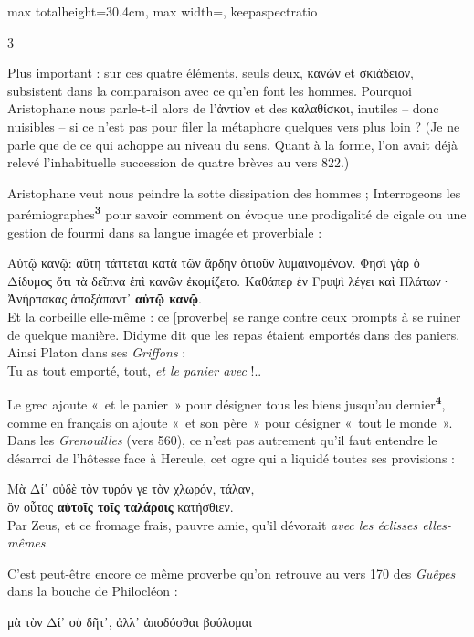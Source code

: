 \documentclass[11pt,twoside]{book}
\newcommand{\italique}[1]{\textit{#1}}
\newcommand{\citComm}[1]{\begin{quoting}[vskip=0.4pt,leftmargin=0.7em,rightmargin=0.2em]#1\end{quoting}}
\newcommand{\marqueur}[1]{\textsuperscript{\color{rubricRed}\textbf{#1}}}
\begin{document}
\begin{adjustbox}{max totalheight=30.4cm, max width=\textwidth, keepaspectratio}
\begin{minipage}{\textwidth}
{\begin{multicols}{3}
\par\vspace{1.5pt}
\noindent Plus important : sur ces quatre éléments, seuls deux, κανών et σκιάδειον, subsistent dans la comparaison avec ce qu'en font les hommes. Pourquoi Aristophane nous parle-t-il alors de l'ἀντίον et des καλαθίσκοι, inutiles -- donc nuisibles -- si ce n'est pas pour filer la métaphore quelques vers plus loin ? (Je ne parle que de ce qui achoppe au niveau du sens. Quant à la forme, l'on avait déjà relevé l'inhabituelle succession de quatre brèves au vers 822.)\\
\par\vspace{1.5pt}
\noindent Aristophane veut nous peindre la sotte dissipation des hommes ; Interrogeons les parémiographes\marqueur{3} pour savoir comment on évoque une prodigalité de cigale ou une gestion de fourmi dans sa langue imagée et proverbiale :
\citComm{Αὐτῷ κανῷ: αὕτη τάττεται κατὰ τῶν ἄρδην ὁτιοῦν λυμαινομένων. Φησὶ γὰρ ὁ Δίδυμος ὅτι τὰ δεῖπνα ἐπὶ κανῶν ἐκομίζετο. Καθάπερ ἐν Γρυψὶ λέγει καὶ Πλάτων·\\
Ἀνήρπακας ἁπαξάπαντ᾿ \textbf{αὐτῷ κανῷ}.\\
Et la corbeille elle-même : ce [proverbe] se range contre ceux prompts à se ruiner de quelque manière. Didyme dit que les repas étaient emportés dans des paniers. Ainsi Platon dans ses \italique{Griffons} :\\
Tu as tout emporté, tout, \italique{et le panier avec} !..}
\par\vspace{1.5pt}
\noindent Le grec ajoute «~et le panier~» pour désigner tous les biens jusqu'au dernier\marqueur{4}, comme en français on ajoute «~et son père~» pour désigner «~tout le monde~». Dans les \italique{Grenouilles} (vers 560), ce n'est pas autrement qu'il faut entendre le désarroi de l'hôtesse face à Hercule, cet ogre qui a liquidé toutes ses provisions :
\citComm{Μὰ Δί᾽ οὐδὲ τὸν τυρόν γε τὸν χλωρόν, τάλαν,\\
ὃν οὗτος \textbf{αὐτοῖς τοῖς ταλάροις} κατήσθιεν.\\
Par Zeus, et ce fromage frais, pauvre amie, qu'il dévorait \italique{avec les éclisses elles-mêmes}.}
\par\vspace{1.5pt}
\noindent C'est peut-être encore ce même proverbe qu'on retrouve au vers 170 des \italique{Guêpes} dans la bouche de Philocléon :
\citComm{μὰ τὸν Δί᾽ οὐ δῆτ᾽, ἀλλ᾽ ἀποδόσθαι βούλομαι\\
}
\end{multicols}}
\end{minipage}
\end{adjustbox}
\end{document}
